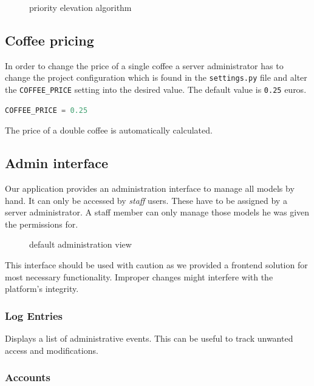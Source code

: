 \begin{figure}[htbp]
\centering
{}
\caption{priority elevation algorithm}
\end{figure}

\subsection{Coffee pricing}\label{coffee-pricing}

In order to change the price of a single coffee a server administrator
has to change the project configuration which is found in the
\texttt{settings.py} file and alter
the \texttt{COFFEE\_PRICE} setting into the desired value. The default
value is \texttt{0.25} euros.

\begin{lstlisting}[language=python]
COFFEE_PRICE = 0.25
\end{lstlisting}

The price of a double coffee is automatically calculated.

\subsection{Admin interface}\label{admin-interface}

Our application provides an administration interface to manage all
models by hand. It can only be accessed by \emph{staff} users. These
have to be assigned by a server administrator. A staff member can only
manage those models he was given the permissions for.

\begin{figure}[htbp]
\centering
{}
\caption{default administration view}
\end{figure}

This interface should be used with caution as we provided a frontend
solution for most necessary functionality. Improper changes might
interfere with the platform's integrity.

\subsubsection{Log Entries}\label{log-entries}

Displays a list of administrative events. This can be useful to track
unwanted access and modifications.

\subsubsection{Accounts}\label{accounts}

